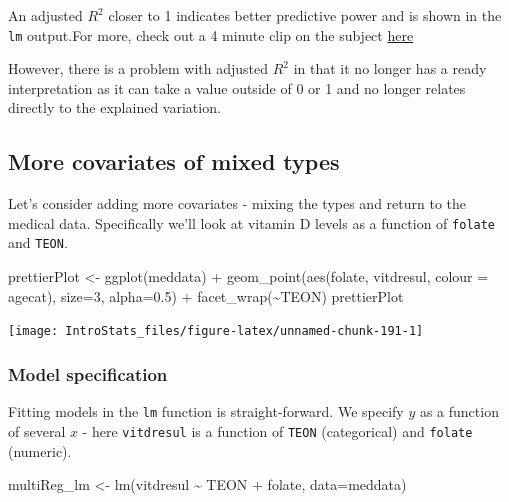 \documentclass[
  oneside]{krantz}
\newenvironment{Shaded}{\begin{snugshade}}{\end{snugshade}}
\newcommand{\AttributeTok}[1]{\textcolor[rgb]{0.77,0.63,0.00}{#1}}
\newcommand{\DecValTok}[1]{\textcolor[rgb]{0.00,0.00,0.81}{#1}}
\newcommand{\FloatTok}[1]{\textcolor[rgb]{0.00,0.00,0.81}{#1}}
\newcommand{\FunctionTok}[1]{\textcolor[rgb]{0.00,0.00,0.00}{#1}}
\newcommand{\NormalTok}[1]{#1}
\newcommand{\OtherTok}[1]{\textcolor[rgb]{0.56,0.35,0.01}{#1}}
\newcommand{\SpecialCharTok}[1]{\textcolor[rgb]{0.00,0.00,0.00}{#1}}
\begin{document}
An adjusted \(R^2\) closer to 1 indicates better predictive power and is shown in the \texttt{lm} output.For more, check out a 4 minute clip on the subject \href{http://www.youtube.com/watch?v=8W2fGkU5LYU}{here}

However, there is a problem with adjusted \(R^2\) in that it no longer has a ready interpretation as it can take a value outside of 0 or 1 and no longer relates directly to the explained variation.

\hypertarget{more-covariates-of-mixed-types}{%
\subsection{More covariates of mixed types}\label{more-covariates-of-mixed-types}}

Let's consider adding more covariates - mixing the types and return to the medical data. Specifically we'll look at vitamin D levels as a function of \texttt{folate} and \texttt{TEON}.

\begin{Shaded}
\begin{Highlighting}[]
\NormalTok{prettierPlot }\OtherTok{\textless{}{-}} \FunctionTok{ggplot}\NormalTok{(meddata) }\SpecialCharTok{+} 
  \FunctionTok{geom\_point}\NormalTok{(}\FunctionTok{aes}\NormalTok{(folate, vitdresul, }\AttributeTok{colour =}\NormalTok{ agecat), }\AttributeTok{size=}\DecValTok{3}\NormalTok{, }\AttributeTok{alpha=}\FloatTok{0.5}\NormalTok{) }\SpecialCharTok{+} 
  \FunctionTok{facet\_wrap}\NormalTok{(}\SpecialCharTok{\textasciitilde{}}\NormalTok{TEON)}
\NormalTok{prettierPlot}
\end{Highlighting}
\end{Shaded}

\begin{center}\texttt{[image: IntroStats\_files/figure-latex/unnamed-chunk-191-1]} \end{center}

\hypertarget{model-specification-2}{%
\subsubsection{Model specification}\label{model-specification-2}}

Fitting models in the \texttt{lm} function is straight-forward. We specify \(y\) as a function of several \(x\) - here \texttt{vitdresul} is a function of \texttt{TEON} (categorical) and \texttt{folate} (numeric).

\begin{Shaded}
\begin{Highlighting}[]
\NormalTok{multiReg\_lm }\OtherTok{\textless{}{-}} \FunctionTok{lm}\NormalTok{(vitdresul }\SpecialCharTok{\textasciitilde{}}\NormalTok{ TEON }\SpecialCharTok{+}\NormalTok{ folate, }\AttributeTok{data=}\NormalTok{meddata)}
\end{Highlighting}
\end{Shaded}
\end{document}
